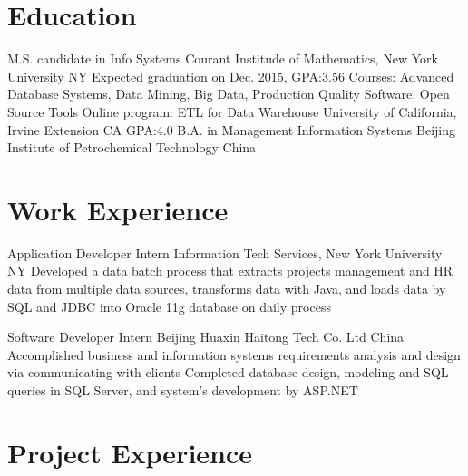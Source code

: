 \documentclass[11pt,a4paper,sans]{moderncv}   %
\begin{document}
\maketitle

\section{Education}
{M.S. candidate in Info Systems}
{Courant Institude of Mathematics, New York University}
{NY}
{Expected graduation on Dec. 2015, GPA:3.56}
{Courses: Advanced Database Systems, Data Mining, Big Data, Production Quality Software, Open Source Tools}
{Online program: ETL for Data Warehouse}
{University of California, Irvine Extension}
{CA}
{GPA:4.0}
{}
{B.A. in Management Information Systems}
{Beijing Institute of Petrochemical Technology}
{China}
{}{}


\section{Work Experience}
\renewcommand{\baselinestretch}{1.0}

{Application Developer Intern}
{}
{Information Tech Services, New York University}
{NY}
{{Developed a data batch process that extracts projects management and HR data from multiple data sources, transforms data with Java, and loads data by SQL and JDBC into Oracle 11g database on daily process}
}


{Software Developer Intern}
{}
{Beijing Huaxin Haitong Tech Co. Ltd}
{China}
{{Accomplished business and information systems requirements analysis and design via communicating with clients}
\newline
{Completed database design, modeling and SQL queries in SQL Server, and system’s development by ASP.NET}}



\section{Project Experience}
\renewcommand{\baselinestretch}{1.0}
\end{document}
